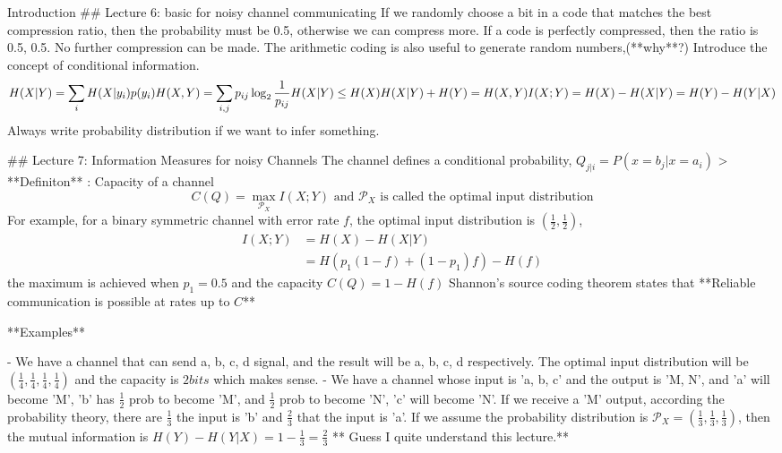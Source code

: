 \documentclass{beamer}
\begin{document}
\begin{frame}[allowframebreaks]{Introduction}
    ## Lecture 6: basic for noisy channel communicating
    If we randomly choose a bit in a code that matches the best compression ratio, then the probability must be 0.5, otherwise we can compress more. 
    If a code is perfectly compressed, then the ratio is 0.5, 0.5. No further compression can be made.
    The arithmetic coding is also useful to generate random numbers,(**why**?)
    Introduce the concept of conditional information. 
    $$H(X|Y) = \sum_i H(X|y_i)p(y_i)\\
    H(X,Y)=\sum_{i,j} p_{ij}\log_2 \frac{1}{p_{ij}}\\
    H(X|Y)\le H(X)\\
    H(X|Y)+H(Y)=H(X,Y)\\
    I(X;Y)=H(X)-H(X|Y)=H(Y)-H(Y|X) $$
    Always write probability distribution if we want to infer something.
    
    ## Lecture 7: Information Measures for noisy Channels
    The channel defines a conditional probability, $Q_{j|i}=P(x=b_j|x=a_i)$
    > **Definiton** : Capacity of a channel
    $$C(Q)=\max_{\mathcal{P}_X}I(X;Y)   \text{ and } \mathcal{P}_X \text{ is called the optimal input distribution}$$
    For example, for a binary symmetric channel with error rate $f$, the optimal input distribution is $(\frac{1}{2}, \frac{1}{2})$, 
    $$\begin{align}I(X;Y)&=H(X)-H(X|Y) \\ &= H(p_1(1-f)+(1-p_1)f) - H(f) \end{align}$$
    the maximum is achieved when $p_1=0.5$ and the capacity $C(Q) = 1 - H(f)$
    Shannon's source coding theorem states that **Reliable communication is possible at rates up to $C$**
    
    **Examples**
    
    - We have a channel that can send a, b, c, d signal, and the result will be a, b, c, d respectively. The optimal input distribution will be $(\frac{1}{4}, \frac{1}{4},\frac{1}{4},\frac{1}{4})$ and the capacity is $2 bits$ which makes sense. 
    - We have a channel whose input is 'a, b, c' and the output is 'M, N', and 'a' will become 'M', 'b' has $\frac{1}{2}$ prob to become 'M', and $\frac{1}{2}$ prob to become 'N', 'c' will become 'N'. If we receive a 'M' output, according the probability theory, there are $\frac{1}{3}$ the input is 'b' and $\frac{2}{3}$ that the input is 'a'. If we assume the probability distribution is $\mathcal{P}_X=(\frac{1}{3},\frac{1}{3},\frac{1}{3})$, then the mutual information is $H(Y) - H(Y|X) = 1 - \frac{1}{3} = \frac{2}{3}$
    ** Guess I quite understand this lecture.**
    

\end{frame}
\end{document}
